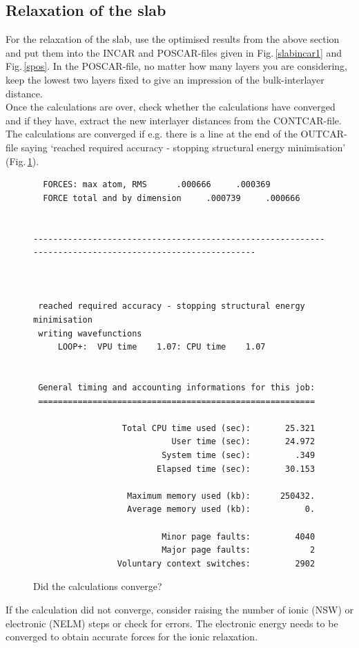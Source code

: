 \documentclass[twoside, 11pt, titlepage, captions=nooneline, a4paper, headsepline]{scrbook}%
\newcommand{\9}{\mathrm}
\newcommand{\0}{\,\mathrm}
\begin{document}
\subsection{Relaxation of the slab}
For the relaxation of the slab, use the optimised results from the above section and put them into the INCAR and POSCAR-files given in Fig.\,\ref{slabincar1} and Fig.\,\ref{spos}. In the POSCAR-file, no matter how many layers you are considering, keep the lowest two layers fixed to give an impression of the bulk-interlayer distance.\\
Once the calculations are over, check whether the calculations have converged and if they have, extract the new interlayer distances from the CONTCAR-file. The calculations are converged if e.g. there is a line at the end of the OUTCAR-file saying `reached required accuracy - stopping structural energy minimisation' (Fig.\,\ref{sconv}).
\begin{figure}[h!!]
\begin{verbatim}
  FORCES: max atom, RMS      .000666     .000369
  FORCE total and by dimension     .000739     .000666


--------------------------------------------------------------------------------------------------------



 reached required accuracy - stopping structural energy minimisation
 writing wavefunctions
     LOOP+:  VPU time    1.07: CPU time    1.07


 General timing and accounting informations for this job:
 ========================================================

                  Total CPU time used (sec):       25.321
                            User time (sec):       24.972
                          System time (sec):         .349
                         Elapsed time (sec):       30.153

                   Maximum memory used (kb):      250432.
                   Average memory used (kb):           0.

                          Minor page faults:         4040
                          Major page faults:            2
                 Voluntary context switches:         2902                                                 
\end{verbatim}
\caption{Did the calculations converge?}
\label{sconv}
\end{figure}
If the calculation did not converge, consider raising the number of ionic (NSW) or electronic (NELM) steps or check for errors. The electronic energy needs to be converged to obtain accurate forces for the ionic relaxation.\\
\end{document}
